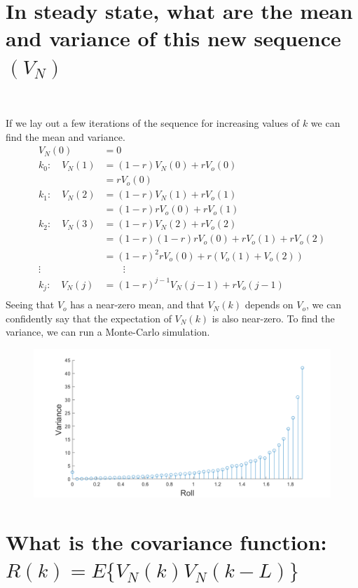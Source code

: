 \documentclass[12pt,letterpaper, onecolumn]{exam}
\begin{document}
\begin{questions}
\begin{parts}
		\part{In steady state, what are the mean and variance of this new sequence $(V_N)$}\\
		\solution
		{If we lay out a few iterations of the sequence for increasing values of $k$ we can find the mean and variance.
			\begin{equation}
				\begin{split}
					V_N(0) & = 0\\
					k_0: \quad V_N(1) & = (1-r)V_N(0) + rV_o(0)\\
					& = rV_o(0)\\
					k_1: \quad V_N(2) & = (1-r)V_N(1) + rV_o(1)\\
					& = (1-r)rV_o(0) + rV_o(1)\\
					k_2: \quad V_N(3) & = (1-r)V_N(2) + rV_o(2)\\
					& = (1-r)(1-r)rV_o(0) + rV_o(1) + rV_o(2)\\
					& = (1-r)^2rV_o(0) + r(V_o(1) + V_o(2))\\
					\vdots \qquad&\qquad \vdots\\
					k_j: \quad V_N(j) & = (1-r)^{j-1}V_N(j-1) + rV_o(j-1)\\
				\end{split}
			\end{equation}
			Seeing that $V_o$ has a near-zero mean, and that $V_N(k)$ depends on $V_o$, we can confidently say that the expectation of $V_N(k)$ is also near-zero. To find the variance, we can run a Monte-Carlo simulation.
			\begin{figure}[!h]
				\centering
				\includegraphics[width=\linewidth]{Q4_c.png}
			\end{figure}
		}
		\part{What is the covariance function: $R(k) = E\{V_N(k)V_N(k-L)\}$}


\end{parts}
\end{questions}
\end{document}
